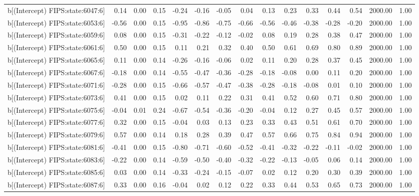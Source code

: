 \begin{table}[ht]
\begin{tabular}{rrrrrrrrrrrrrrr}
  b[(Intercept) FIPS:state:6047:6] & 0.14 & 0.00 & 0.15 & -0.24 & -0.16 & -0.05 & 0.04 & 0.13 & 0.23 & 0.33 & 0.44 & 0.54 & 2000.00 & 1.00 \\ 
  b[(Intercept) FIPS:state:6053:6] & -0.56 & 0.00 & 0.15 & -0.95 & -0.86 & -0.75 & -0.66 & -0.56 & -0.46 & -0.38 & -0.28 & -0.20 & 2000.00 & 1.00 \\ 
  b[(Intercept) FIPS:state:6059:6] & 0.08 & 0.00 & 0.15 & -0.31 & -0.22 & -0.12 & -0.02 & 0.08 & 0.19 & 0.28 & 0.38 & 0.47 & 2000.00 & 1.00 \\ 
  b[(Intercept) FIPS:state:6061:6] & 0.50 & 0.00 & 0.15 & 0.11 & 0.21 & 0.32 & 0.40 & 0.50 & 0.61 & 0.69 & 0.80 & 0.89 & 2000.00 & 1.00 \\ 
  b[(Intercept) FIPS:state:6065:6] & 0.11 & 0.00 & 0.14 & -0.26 & -0.16 & -0.06 & 0.02 & 0.11 & 0.20 & 0.28 & 0.37 & 0.45 & 2000.00 & 1.00 \\ 
  b[(Intercept) FIPS:state:6067:6] & -0.18 & 0.00 & 0.14 & -0.55 & -0.47 & -0.36 & -0.28 & -0.18 & -0.08 & 0.00 & 0.11 & 0.20 & 2000.00 & 1.00 \\ 
  b[(Intercept) FIPS:state:6071:6] & -0.28 & 0.00 & 0.15 & -0.66 & -0.57 & -0.47 & -0.38 & -0.28 & -0.18 & -0.08 & 0.01 & 0.10 & 2000.00 & 1.00 \\ 
  b[(Intercept) FIPS:state:6073:6] & 0.41 & 0.00 & 0.15 & 0.02 & 0.11 & 0.22 & 0.31 & 0.41 & 0.52 & 0.60 & 0.71 & 0.80 & 2000.00 & 1.00 \\ 
  b[(Intercept) FIPS:state:6075:6] & -0.04 & 0.01 & 0.24 & -0.67 & -0.54 & -0.36 & -0.20 & -0.04 & 0.12 & 0.27 & 0.45 & 0.57 & 2000.00 & 1.00 \\ 
  b[(Intercept) FIPS:state:6077:6] & 0.32 & 0.00 & 0.15 & -0.04 & 0.03 & 0.13 & 0.23 & 0.33 & 0.43 & 0.51 & 0.61 & 0.70 & 2000.00 & 1.00 \\ 
  b[(Intercept) FIPS:state:6079:6] & 0.57 & 0.00 & 0.14 & 0.18 & 0.28 & 0.39 & 0.47 & 0.57 & 0.66 & 0.75 & 0.84 & 0.94 & 2000.00 & 1.00 \\ 
  b[(Intercept) FIPS:state:6081:6] & -0.41 & 0.00 & 0.15 & -0.80 & -0.71 & -0.60 & -0.52 & -0.41 & -0.32 & -0.22 & -0.11 & -0.02 & 2000.00 & 1.00 \\ 
  b[(Intercept) FIPS:state:6083:6] & -0.22 & 0.00 & 0.14 & -0.59 & -0.50 & -0.40 & -0.32 & -0.22 & -0.13 & -0.05 & 0.06 & 0.14 & 2000.00 & 1.00 \\ 
  b[(Intercept) FIPS:state:6085:6] & 0.03 & 0.00 & 0.14 & -0.33 & -0.24 & -0.15 & -0.07 & 0.02 & 0.12 & 0.20 & 0.30 & 0.39 & 2000.00 & 1.00 \\ 
  b[(Intercept) FIPS:state:6087:6] & 0.33 & 0.00 & 0.16 & -0.04 & 0.02 & 0.12 & 0.22 & 0.33 & 0.44 & 0.53 & 0.65 & 0.73 & 2000.00 & 1.00 \\ 

\end{tabular}
\end{table}
